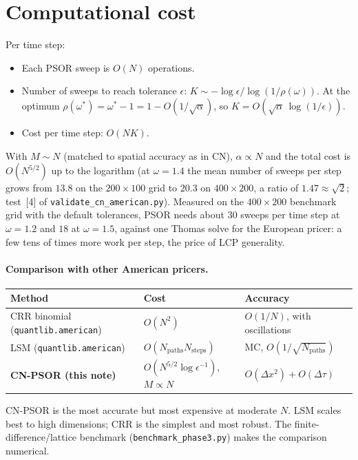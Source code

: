 \documentclass[11pt,a4paper]{article}
\begin{document}
\section{Computational cost}

Per time step:
\begin{itemize}[leftmargin=2em]
\item Each PSOR sweep is $O(N)$ operations.
\item Number of sweeps to reach tolerance $\epsilon$:
$K \sim -\log\epsilon / \log(1/\rho(\omega))$. At the optimum
$\rho(\omega^*) = \omega^* - 1 = 1 - O(1/\sqrt{\alpha})$, so
$K = O(\sqrt{\alpha}\,\log(1/\epsilon))$.
\item Cost per time step: $O(N K)$.
\end{itemize}
With $M \sim N$ (matched to spatial accuracy as in CN), $\alpha \propto
N$ and the total cost is $O(N^{5/2})$ up to the logarithm (at
$\omega = 1.4$ the mean number of sweeps per step grows from $13.8$ on
the $200 \times 100$ grid to $20.3$ on $400 \times 200$, a ratio of
$1.47 \approx \sqrt{2}$; test~[4] of \texttt{validate\_cn\_american.py}).
Measured on
the $400 \times 200$ benchmark grid with the default tolerances, PSOR
needs about $30$ sweeps per time step at $\omega = 1.2$ and $18$ at
$\omega = 1.5$, against one Thomas solve for the European pricer: a few
tens of times more work per step, the price of LCP generality.

\paragraph{Comparison with other American pricers.}
\begin{center}
\begin{tabular}{lll}
\hline
Method & Cost & Accuracy \\
\hline
CRR binomial (\texttt{quantlib.american}) & $O(N^2)$ & $O(1/N)$, with oscillations \\
LSM (\texttt{quantlib.american})          & $O(N_{\mathrm{paths}} N_{\mathrm{steps}})$ & MC, $O(1/\sqrt{N_{\mathrm{paths}}})$ \\
\textbf{CN-PSOR (this note)} & $O(N^{5/2} \log\epsilon^{-1})$, $M \propto N$ & $O(\Delta x^2) + O(\Delta\tau)$ \\
\hline
\end{tabular}
\end{center}
CN-PSOR is the most accurate but most expensive at moderate $N$.
LSM scales best to high dimensions; CRR is the simplest and most
robust. The finite-difference/lattice benchmark (\texttt{benchmark\_phase3.py}) makes the comparison numerical.
\end{document}
